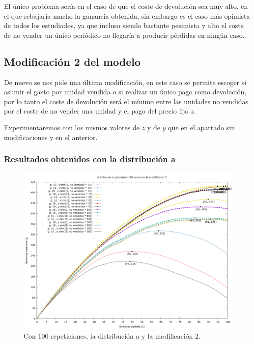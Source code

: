 \documentclass[12pt, spanish]{article}
\begin{document}
El único problema sería en el caso de que el coste de devolución sea muy alto, en el que rebajaría mucho la ganancia obtenida, sin embargo es el caso más opimista de todos los estudiados, ya que incluso siendo bastante pesimista y alto el coste de no vender un único periódico no llegaría a producir pérdidas en ningún caso.



\subsection{Modificación 2 del modelo}

De nuevo se nos pide una última modificación, en este caso se permite escoger si asumir el gasto por unidad vendida o si realizar un único pago como devolución, por lo tanto el coste de devolución será el mínimo entre las unidades no vendidas por el coste de no vender una unidad y el pago del precio fijo $z$.

Experimentaremos con los mismos valores de $z$ y de $y$ que en el apartado sin modificaciones y en el anterior.

\subsubsection{Resultados obtenidos con la distribución a}


\begin{figure}[H]
	\centering
	\includegraphics[scale = 0.2]{prob_a/datos_a_100_2.png}
	\caption{Con 100 repeticiones, la distribución a y la modificación 2.}
	\label{fig:ej1_a_100}

\end{figure}
\end{document}
